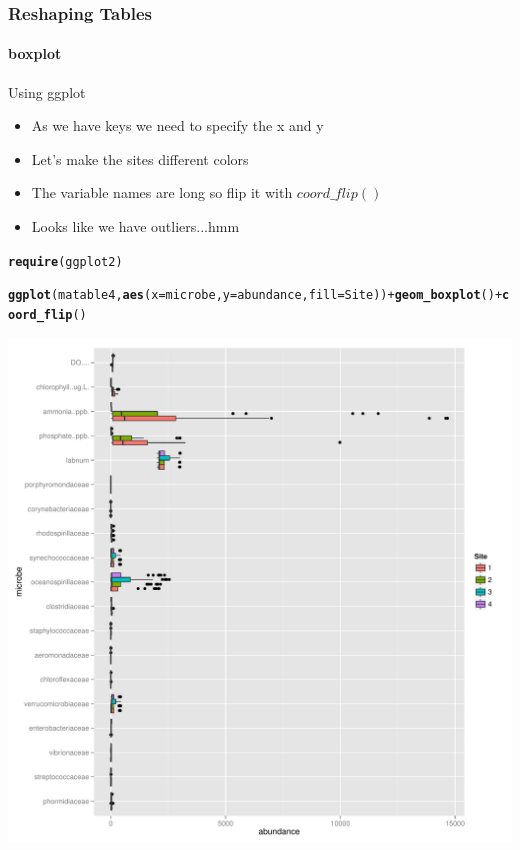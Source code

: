 \documentclass[10pt,handout,english]{beamer}\usepackage[]{graphicx}\usepackage[]{color}
\makeatletter
\newcommand{\hlopt}[1]{\textcolor[rgb]{0,0,0}{#1}}%
\newcommand{\hlstd}[1]{\textcolor[rgb]{0.345,0.345,0.345}{#1}}%
\newcommand{\hlkwc}[1]{\textcolor[rgb]{0.333,0.667,0.333}{#1}}%
\newcommand{\hlkwd}[1]{\textcolor[rgb]{0.737,0.353,0.396}{\textbf{#1}}}%
\newenvironment{kframe}{%
 \def\at@end@of@kframe{}%
 \ifinner\ifhmode%
  \def\at@end@of@kframe{\end{minipage}}%
  \begin{minipage}{\columnwidth}%
 \fi\fi%
 \def\FrameCommand##1{\hskip\@totalleftmargin \hskip-\fboxsep
 \colorbox{shadecolor}{##1}\hskip-\fboxsep
     \hskip-\linewidth \hskip-\@totalleftmargin \hskip\columnwidth}%
 \MakeFramed {\advance\hsize-\width
   \@totalleftmargin\z@ \linewidth\hsize
   \@setminipage}}%
 {\par\unskip\endMakeFramed%
 \at@end@of@kframe}
\newenvironment{knitrout}{}{} %
\makeatother
\begin{document}
\begin{frame}[fragile]
  \frametitle{Reshaping Tables}
  \framesubtitle{ boxplot}
  \begin{block}{Using ggplot}
  \begin{itemize}
  \item As we have keys we need to specify the x and y
  \item Let's make the sites different colors
  \item The variable names are long so flip it with $coord\_flip()$
  \item Looks like we have outliers...hmm
  \end{itemize}
  \end{block}

\begin{knitrout}
\color{fgcolor}\begin{kframe}
\begin{alltt}
\hlkwd{require}\hlstd{(ggplot2)}
\end{alltt}


{\ttfamily\noindent\itshape\color{messagecolor}{\#\# Loading required package: ggplot2}}\begin{alltt}
\hlkwd{ggplot}\hlstd{(matable4,}\hlkwd{aes}\hlstd{(}\hlkwc{x}\hlstd{=microbe,}\hlkwc{y}\hlstd{=abundance,}\hlkwc{fill}\hlstd{=Site))} \hlopt{+} \hlkwd{geom_boxplot}\hlstd{()} \hlopt{+}  \hlkwd{coord_flip}\hlstd{()}
\end{alltt}


{\ttfamily\noindent\color{warningcolor}{\#\# Warning: Removed 24 rows containing non-finite values (stat\_boxplot).}}\end{kframe}
\includegraphics[width=.85\linewidth]{figure/chunk10iv-1} 

\end{knitrout}

\end{frame}  
\end{document}
